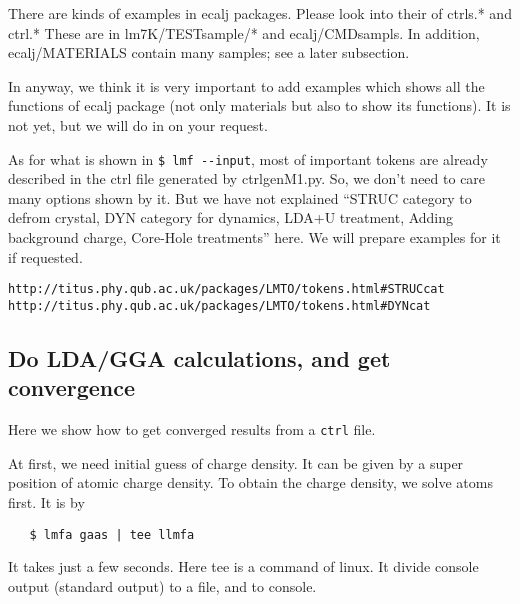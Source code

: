 \documentclass[a4paper,10pt,epsf,fleqn]{article}
\begin{document}
There are kinds of examples in ecalj packages.
Please look into their of ctrls.* and ctrl.*
These are in lm7K/TESTsample/* and ecalj/CMDsampls. 
In addition, ecalj/MATERIALS contain many samples; see a later subsection. 

In anyway, we think it is very important to add examples which shows all
the functions of ecalj package (not only materials but also to show its
functions). It is not yet, but we will do in on your request.

As for what is shown in \verb+$ lmf --input+, most of important tokens are
already described in the ctrl file generated by ctrlgenM1.py.
So, we don't need to care many options shown by it.
But we have not explained 
``STRUC category to defrom crystal, DYN category for dynamics, LDA+U
treatment, Adding background charge, Core-Hole treatments'' here. 
We will prepare examples for it if requested.
\begin{verbatim}
http://titus.phy.qub.ac.uk/packages/LMTO/tokens.html#STRUCcat
http://titus.phy.qub.ac.uk/packages/LMTO/tokens.html#DYNcat
\end{verbatim}

\subsection{Do LDA/GGA calculations, and get convergence}
\label{lm7K-scf}
Here we show how to get converged results from a \verb+ctrl+ file.

At first, we need initial guess of charge density.
It can be given by a super position of atomic charge density.
To obtain the charge density, we solve atoms first. It is by
\begin{verbatim}
   $ lmfa gaas | tee llmfa
\end{verbatim}
It takes just a few seconds. Here tee is a command of linux.
It divide console output (standard output) to a file, and to console.
\end{document}
